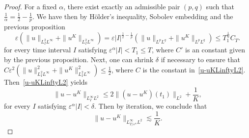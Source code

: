 \documentclass[10pt,a4paper]{article}
\begin{document}
  \begin{proof}
    For a fixed \(\alpha\), there exist exactly an admissible pair \((p,q)\) such 
    that \(\frac1\alpha = \frac12 - \frac1p\). We have then by H\"older's 
    inequality, Sobolev embedding and the previous proposition 
    \begin{equation}\label{uL2Linfty}
      \varepsilon (\|u\|_{L^2_I L^\infty} + \|u^K\|_{L^2_I L^\infty}) = 
      \varepsilon |I|^{\frac12-\frac1p} (\|u\|_{L^p L^q} + \|u^K\|_{L^p L^q}) 
      \leq T_1^{\frac1\alpha} C_T.
    \end{equation}
    for every time interval \(I\) satisfying \(\varepsilon^\alpha |I| <
    T_1 \leq T\), where \(C'\) is an constant given by the previous proposition.
    Next, one can shrink \(\delta\) if necessary to ensure that
    \(C\varepsilon^2 (\|u\|_{L^2_I L^\infty}^2 + \|u^K\|_{L^2_I L^\infty}^2)
    \leq \frac12\), where \(C\) is the constant in~\eqref{u-uKLinftyL2}. 
    Then~\eqref{u-uKLinftyL2} yields 
    \[ \|u-u^K\|_{L^\infty_I L^2} \leq 2\|(u-u^K)(t_1)\|_{L^2} + \frac1K, \]
    for every \(I\) satisfying \(\varepsilon^\alpha |I| < \delta\). Then by
    iteration, we conclude that 
    \[ \|u-u^K\|_{L^\infty_{T/\varepsilon^\alpha}L^2} \lesssim \frac1K. \]
  \end{proof}

\end{document}
